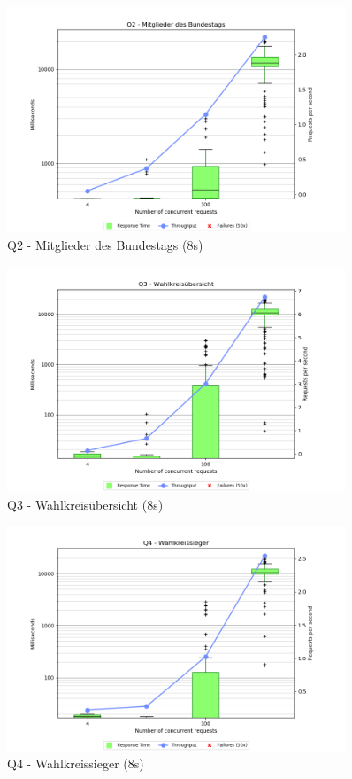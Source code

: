 \documentclass[a4paper]{scrreprt}
\begin{document}
\begin{figure}[h]
\centering
\includegraphics[width=0.9\textwidth]{images/plots_8s/Q2}
\caption {Q2 - Mitglieder des Bundestags (8s)}
\end{figure}

\begin{figure}[h]
\centering
\includegraphics[width=0.9\textwidth]{images/plots_8s/Q3}
\caption {Q3 - Wahlkreisübersicht (8s)}
\end{figure}

\begin{figure}[h]
\centering
\includegraphics[width=0.9\textwidth]{images/plots_8s/Q4}
\caption {Q4 - Wahlkreissieger (8s)}
\end{figure}
\end{document}
